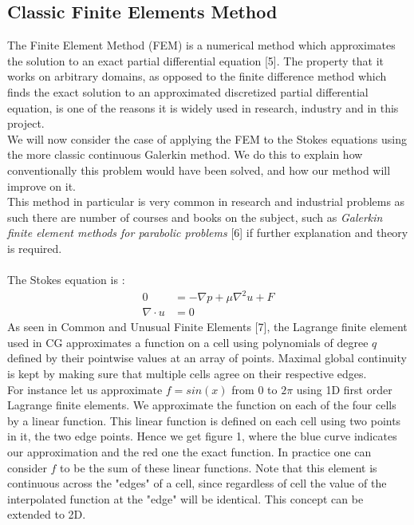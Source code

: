\documentclass[11pt,twoside,a4paper]{article}
\begin{document}
\subsection{Classic Finite Elements Method}
The Finite Element Method (FEM) is a numerical method which approximates the solution to an exact partial differential equation [5]. The property that it works on arbitrary domains, as opposed to the finite difference method which finds the exact solution to an approximated discretized partial differential equation, is one of the reasons it is widely used in research, industry and in this project.\\
We will now consider the case of applying the FEM to the Stokes equations using the more classic continuous Galerkin method. We do this to explain how conventionally this problem would have been solved, and how our method will improve on it.\\
This method in particular is very common in research and industrial problems as such there are number of courses and books on the subject, such as \textit{Galerkin finite element methods for parabolic problems} [6] if further explanation and theory is required.\\
\\
The Stokes equation is :
\begin{align}
0 &= -\nabla p + \mu \nabla^2 u + F \\
\nabla \cdot u &= 0
\end{align}
As seen in Common and Unusual Finite Elements [7], the Lagrange finite element used in CG approximates a function on a cell using polynomials of degree $q$ defined by their pointwise values at an array of points. Maximal global continuity is kept by making sure  that multiple cells agree on their respective edges.\\
For instance let us approximate $f = sin(x)$ from $0$ to $2 \pi$ using 1D first order Lagrange finite elements. We approximate the function on each of the four cells by a linear function. This linear function is defined on each cell using two points in it, the two edge points. Hence we get figure 1, where the blue curve indicates our approximation and the red one the exact function. In practice one can consider $f$ to be the sum of these linear functions. Note that this element is continuous across the "edges" of a cell, since regardless of cell the value of the interpolated function at the "edge" will be identical. This concept can be extended to 2D.\\
\end{document}
